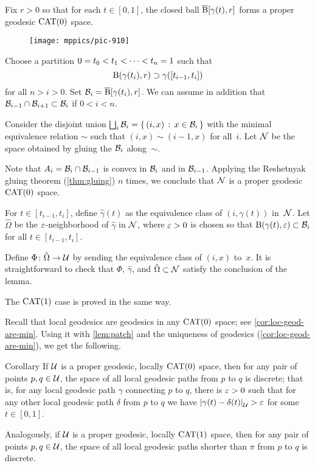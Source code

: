 Fix $r>0$ so that for each $t\in[0,1]$,
the closed ball
$\overline{\mathrm{B}}{}[\gamma(t),r]$ forms a proper geodesic $\mathrm{CAT}(0)$ space.

\begin{figure}[ht!]
\vskip-0mm
\centering
\texttt{[image: mppics/pic-910]}
\end{figure}

Choose a partition $0\z=t_0<t_1<\dots<t_n\z=1$ such that 
\[\mathrm{B}{}(\gamma(t_i),r)\supset \gamma([t_{i-1},t_i])\] for all $n>i>0$.
Set $\mathcal{B}_i=\overline{\mathrm{B}}{}[\gamma(t_i),r]$.
We can assume in addition that $\mathcal{B}_{i-1}\cap \mathcal{B}_{i+1}\subset \mathcal{B}_{i}$ if $0<i<n$.

Consider the disjoint union $\bigsqcup_i\mathcal{B}_i=\left\{\,{(i,x)}\,:\,{x\in\mathcal{B}_i}\,\right\}$ with the minimal equivalence relation $\sim$ such that $(i,x)\sim(i-1,x)$ for all~$i$.
Let  $\mathcal{N}$ be the space obtained by gluing the $\mathcal{B}_i$ along~$\sim$.

Note that $A_i=\mathcal{B}_i\cap\mathcal{B}_{i-1}$ is convex in $\mathcal{B}_i$ and in $\mathcal{B}_{i-1}$.
Applying the Reshetnyak gluing theorem (\ref{thm:gluing}) $n$ times, 
we conclude that $\mathcal{N}$ is a proper geodesic $\mathrm{CAT}(0)$ space.

For $t\in[t_{i-1},t_i]$, define $\hat\gamma(t)$ as the equivalence class of $(i,\gamma(t))$ in~$\mathcal{N}$.
Let $\hat\Omega$ be the $\varepsilon$-neighborhood of $\hat\gamma$ in $\mathcal{N}$, where $\varepsilon>0$ is chosen so that $\mathrm{B}{}(\gamma(t),\varepsilon)\subset\mathcal{B}_i$ for all $t\in[t_{i-1},t_i]$.

Define $\Phi\colon\hat\Omega\to\mathcal{U}$
by sending the equivalence class of $(i,x)$ to~$x$.
It is straightforward to check that $\Phi$, 
$\hat\gamma$, and $\hat\Omega\subset\mathcal{N}$ satisfy the conclusion of  the lemma.

The $\mathrm{CAT}(1)$ case is proved in the same way.
\qeds

Recall that local geodesics are geodesics in any $\mathrm{CAT}(0)$ space; see \ref{cor:loc-geod-are-min}.
Using it with \ref{lem:patch} and the uniqueness of geodesics (\ref{cor:loc-geod-are-min}), we get the following.

\begin{thm}{Corollary}\label{cor:discrete-paths}
If $\mathcal{U}$ is a proper geodesic, locally $\mathrm{CAT}(0)$ space, then for any pair of points $p,q\in\mathcal{U}$, the space of all local geodesic paths from $p$ to $q$ is discrete;
that is, for any local geodesic path $\gamma$ connecting $p$ to $q$, there is $\varepsilon>0$ such that for any other local geodesic path $\delta$ from $p$ to $q$ we have
$\dist{\gamma(t)}{\delta(t)}{\spc{U}}>\eps$ for some $t\in[0,1]$.

Analogously, if $\mathcal{U}$ is a proper geodesic, locally $\mathrm{CAT}(1)$ space, then for any pair of points $p,q\in\mathcal{U}$,  the space of all local geodesic paths shorter than $\pi$ from $p$ to $q$ is discrete.
\end{thm}

